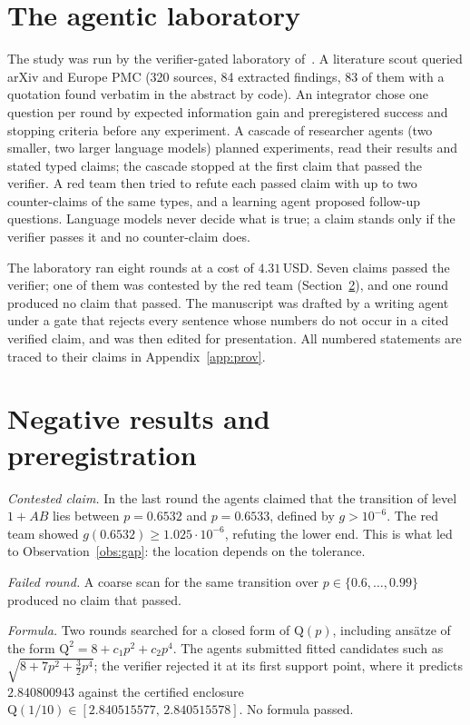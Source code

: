 \documentclass[10pt,twocolumn,a4paper]{article}
\theoremstyle{definition}
\theoremstyle{remark}
\newcommand{\Q}{\mathrm{Q}}
\begin{document}
\section{The agentic laboratory}\label{sec:lab}

The study was run by the verifier-gated laboratory of~\cite{repo}. A literature scout queried arXiv and Europe PMC (320 sources,
84 extracted findings, 83 of them with a quotation found verbatim in the abstract by code). An integrator chose one question per
round by expected information gain and preregistered success and stopping criteria before any experiment. A cascade of researcher
agents (two smaller, two larger language models) planned experiments, read their results and stated typed claims; the cascade
stopped at the first claim that passed the verifier. A red team then tried to refute each passed claim with up to two
counter-claims of the same types, and a learning agent proposed follow-up questions. Language models never decide what is true; a
claim stands only if the verifier passes it and no counter-claim does.

The laboratory ran eight rounds at a cost of $4.31$\,USD. Seven claims passed the verifier; one of them was contested by the red
team (Section~\ref{sec:neg}), and one round produced no claim that passed. The manuscript was drafted by a writing agent under a
gate that rejects every sentence whose numbers do not occur in a cited verified claim, and was then edited for presentation. All
numbered statements are traced to their claims in Appendix~\ref{app:prov}.

\section{Negative results and preregistration}\label{sec:neg}

\emph{Contested claim.} In the last round the agents claimed that the transition of level $1{+}AB$ lies between $p=0.6532$ and
$p=0.6533$, defined by $g>10^{-6}$. The red team showed $g(0.6532)\ge1.025\cdot10^{-6}$, refuting the lower end. This is what led
to Observation~\ref{obs:gap}: the location depends on the tolerance.

\emph{Failed round.} A coarse scan for the same transition over $p\in\{0.6,\dots,0.99\}$ produced no claim that passed.

\emph{Formula.} Two rounds searched for a closed form of $\Q(p)$, including ansätze of the form $\Q^2=8+c_1p^2+c_2p^4$. The
agents submitted fitted candidates such as $\sqrt{8+7p^2+\tfrac32p^4}$; the verifier rejected it at its first support point, where
it predicts $2.840800943$ against the certified enclosure $\Q(1/10)\in[2.840515577,\,2.840515578]$. No formula passed.
\end{document}
